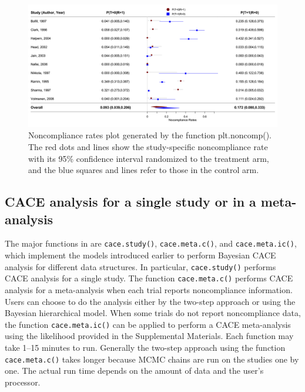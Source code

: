 \begin{figure}

{\centering \includegraphics[width=1\linewidth,height=0.27\textheight]{noncomp} 

}

\caption{Noncompliance rates plot generated by the function plt.noncomp(). The red dots and lines show the study-specific noncompliance rate with its 95\% confidence interval randomized to the treatment arm, and the blue squares and lines refer to those in the control arm.}\label{fig:noncomp}
\end{figure}

\hypertarget{cace-analysis-for-a-single-study-or-in-a-meta-analysis}{%
\subsection{CACE analysis for a single study or in a meta-analysis}\label{cace-analysis-for-a-single-study-or-in-a-meta-analysis}}

The major functions in 
are \texttt{cace.study()}, \texttt{cace.meta.c()}, and \texttt{cace.meta.ic()}, which implement the models introduced earlier to perform Bayesian CACE analysis for different data structures. In particular, \texttt{cace.study()} performs CACE analysis for a single study. The function \texttt{cace.meta.c()} performs CACE analysis for a meta-analysis when each trial reports noncompliance information. Users can choose to do the analysis either by the two-step approach or using the Bayesian hierarchical model. When some trials do not report noncompliance data, the function \texttt{cace.meta.ic()} can be applied to perform a CACE meta-analysis using the likelihood provided in the Supplemental Materials. Each function may take 1--15 minutes to run. Generally the two-step approach using the function \texttt{cace.meta.c()} takes longer because MCMC chains are run on the studies one by one. The actual run time depends on the amount of data and the user's processor.

